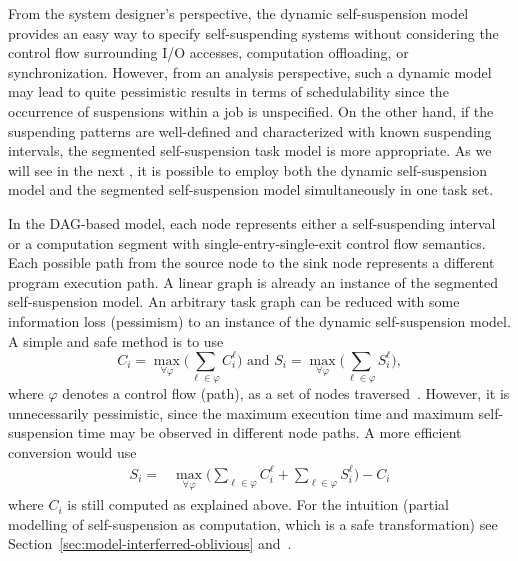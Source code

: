 From the system designer's perspective, the dynamic self-suspension model provides an easy way to specify self-suspending systems 
without considering the control flow surrounding I/O accesses, computation offloading, or synchronization. However, from an analysis perspective, such a 
dynamic model may lead to quite pessimistic results in terms of schedulability since the occurrence of suspensions within a job is 
unspecified. On the other hand, if the suspending patterns are well-defined and characterized with known suspending intervals, the 
segmented self-suspension task model is more appropriate.   
As we will see in the next \mysectionrefnormal{}, it is possible to employ both the dynamic self-suspension model and the segmented self-suspension model simultaneously 
in one task set.




In the DAG-based model\cite{bletsas:thesis}, each node represents either a self-suspending interval or a computation segment
with single-entry-single-exit control flow semantics. Each possible path from the source node to the sink node
represents a different program execution path. A linear graph is already an instance of the segmented self-suspension model.
An arbitrary task graph can be reduced with some information loss (pessimism) to an instance of the dynamic self-suspension model. 
%
%
%
A simple and safe method is to use
\begin{equation*} 
C_i =  \max_{\forall \varphi} \Big(  \sum_{\ell \in \varphi} C_i^\ell   \Big)        \mbox{   and }
S_i =  \max_{\forall \varphi} \Big(  \sum_{\ell \in \varphi} S_i^\ell   \Big),
\end{equation*}
where $\varphi$ denotes a control flow (path), as a set of nodes traversed~\cite{RTAS-AudsleyB04,bletsas:thesis}. However, it is unnecessarily pessimistic, since the maximum execution time and maximum self-suspension 
time may be observed in different node paths. A more efficient conversion would use
\begin{align} 
S_i =  &\max_{\forall \varphi} \Big(  \sum_{\ell \in \varphi} C_i^\ell + \sum_{\ell \in \varphi} S_i^\ell   \Big)  - C_i  \nonumber
\end{align}
where $C_i$ is still computed as explained above. For the intuition (partial modelling of self-suspension as computation, which is a safe transformation) 
see Section~\ref{sec:model-interferred-oblivious} and~\cite{RTAS-AudsleyB04,BletsasReport2015}.

